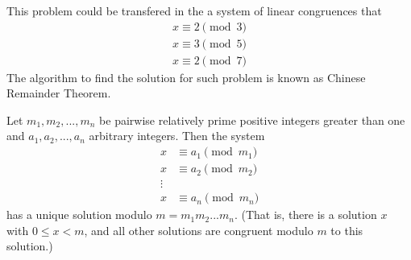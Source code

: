         This problem could be transfered in the a system of linear congruences that
        $${\begin{array}{c}x\equiv2\pmod{3}\\x\equiv3\pmod{5}\\x\equiv2\pmod{7}\end{array}}$$
        The algorithm to find the solution for such problem is known as Chinese Remainder Theorem.
        \begin{theorem}
            Let $m_1,m_2,...,m_n$ be pairwise relatively prime positive integers greater than one and $a_1,a_2,...,a_n$ arbitrary integers. Then the system
            \begin{align*}
                x&\equiv a_1\pmod{m_1}\\
                x&\equiv a_2 \pmod{m_2}\\
                \vdots&\\
                x&\equiv a_n \pmod{m_n}
            \end{align*}
            has a unique solution modulo $m=m_1m_2...m_n.$ (That is, there is a solution $x$ with
            $0\leq x<m$, and all other solutions are congruent modulo $m$ to this solution.)
        \end{theorem}
